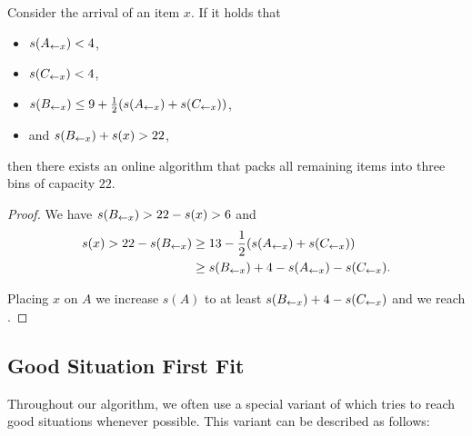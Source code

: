 %

\begin{goodsit}\label{lem:gs7}
Consider the arrival of an item $x$.
If it holds that
\begin{itemize}
\item $s(A_{\leftarrow x})<4$, 
\item $s(C_{\leftarrow x})<4$, %
\item $s(B_{\leftarrow x})\le 9+\frac{1}{2}(s(A_{\leftarrow x})+s(C_{\leftarrow x}))$, %
\item and $s(B_{\leftarrow x})+s(x)>22$,
\end{itemize}
then there exists an online algorithm that packs all remaining items into
three bins of capacity $22$.
\end{goodsit}

\begin{proof}
We have $s(B_{\leftarrow x}) > 22 - s(x) > 6$ and 
\begin{align*}
s(x) > 22-s(B_{\leftarrow x}) &\ge 13 - \frac{1}{2}(s(A_{\leftarrow x})+s(C_{\leftarrow x}))\\ &\ge s(B_{\leftarrow x})+4-s(A_{\leftarrow x})-s(C_{\leftarrow x}).
\end{align*}

Placing $x$ on $A$ we increase $s(A)$ to at least $s(B_{\leftarrow x})+4-s(C_{\leftarrow x})$
and we reach . %
\end{proof}


\subsection{Good Situation First Fit}\label{sec:3alg}

Throughout our algorithm, we often use a special variant of \FF\/
which tries to reach good situations whenever possible. This
variant can be described as follows:

